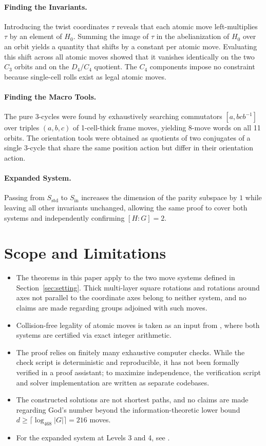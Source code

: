 \documentclass[a4paper,11pt]{article}
\begin{document}
\paragraph{Finding the Invariants.}
Introducing the twist coordinates $\tau$ reveals that each atomic move left-multiplies $\tau$ by an element of $H_0$.
Summing the image of $\tau$ in the abelianization of $H_0$ over an orbit yields a quantity that shifts by a constant per atomic move.
Evaluating this shift across all atomic moves showed that it vanishes identically on the two $C_3$ orbits and on the $D_4/C_4$ quotient.
The $C_4$ components impose no constraint because single-cell rolls exist as legal atomic moves.

\paragraph{Finding the Macro Tools.}
The pure 3-cycles were found by exhaustively searching commutators $[a,bcb^{-1}]$ over triples $(a,b,c)$ of 1-cell-thick frame moves, yielding 8-move words on all 11 orbits.
The orientation tools were obtained as quotients of two conjugates of a single 3-cycle that share the same position action but differ in their orientation action.

\paragraph{Expanded System.}
Passing from $S_{\mathrm{std}}$ to $S_{\mathrm{in}}$ increases the dimension of the parity subspace by $1$ while leaving all other invariants unchanged, allowing the same proof to cover both systems and independently confirming $[H:G]=2$.

\section{Scope and Limitations}

\begin{itemize}
\item The theorems in this paper apply to the two move systems defined in Section~\ref{sec:setting}.
Thick multi-layer square rotations and rotations around axes not parallel to the coordinate axes belong to neither system, and no claims are made regarding groups adjoined with such moves.
\item Collision-free legality of atomic moves is taken as an input from , where both systems are certified via exact integer arithmetic.
\item The proof relies on finitely many exhaustive computer checks. While the check script is deterministic and reproducible, it has not been formally verified in a proof assistant; to maximize independence, the verification script and solver implementation are written as separate codebases.
\item The constructed solutions are not shortest paths, and no claims are made regarding God's number beyond the information-theoretic lower bound $d\ge\lceil\log_{468}|G|\rceil=216$ moves.
\item For the expanded system at Levels 3 and 4, see .
\end{itemize}
\end{document}

